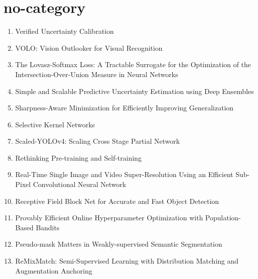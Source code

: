 \documentclass[acmlarge]{acmart}
\begin{document}
\section{no-category}
\begin{enumerate}
	\item Verified Uncertainty Calibration \cite{Kumar2019VerifiedUC} 

	\item VOLO: Vision Outlooker for Visual Recognition \cite{Yuan2021VOLOVO} 

	\item The Lovasz-Softmax Loss: A Tractable Surrogate for the Optimization of the Intersection-Over-Union Measure in Neural Networks \cite{Berman2018TheLL} 

	\item Simple and Scalable Predictive Uncertainty Estimation using Deep Ensembles \cite{Lakshminarayanan2017SimpleAS} 

	\item Sharpness-Aware Minimization for Efficiently Improving Generalization \cite{Foret2021SharpnessAwareMF} 

	\item Selective Kernel Networks \cite{Li2019SelectiveKN} 

	\item Scaled-YOLOv4: Scaling Cross Stage Partial Network \cite{Wang2021ScaledYOLOv4SC} 

	\item Rethinking Pre-training and Self-training \cite{Zoph2020RethinkingPA} 

	\item Real-Time Single Image and Video Super-Resolution Using an Efficient Sub-Pixel Convolutional Neural Network \cite{Shi2016RealTimeSI} 

	\item Receptive Field Block Net for Accurate and Fast Object Detection \cite{Liu2018ReceptiveFB} 

	\item Provably Efficient Online Hyperparameter Optimization with Population-Based Bandits \cite{ParkerHolder2020ProvablyEO} 

	\item Pseudo-mask Matters in Weakly-supervised Semantic Segmentation \cite{Li2021PseudomaskMI} 

	\item ReMixMatch: Semi-Supervised Learning with Distribution Matching and Augmentation Anchoring \cite{Berthelot2020ReMixMatchSL} 


\end{enumerate}
\end{document}
